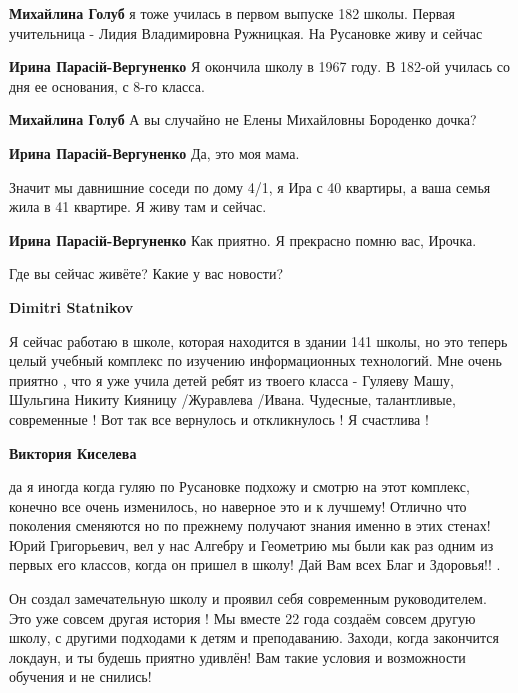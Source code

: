 \begin{itemize}
\begin{itemize}
\textbf{Михайлина Голуб} я тоже училась в первом выпуске 182 школы. Первая учительница - Лидия Владимировна Ружницкая. На Русановке живу и сейчас

\textbf{Ирина Парасій-Вергуненко} Я окончила школу в 1967 году. В 182-ой училась со дня ее основания, с 8-го класса.

\textbf{Михайлина Голуб} А вы случайно не Елены Михайловны Бороденко дочка?

\begin{itemize} %
\textbf{Ирина Парасій-Вергуненко} Да, это моя мама.

Значит мы давнишние соседи по дому 4/1, я Ира с 40 квартиры, а ваша семья жила в 41 квартире. Я живу там и сейчас.

\textbf{Ирина Парасій-Вергуненко} Как приятно. Я прекрасно помню вас, Ирочка.

Где вы сейчас живёте? Какие у вас новости?
\end{itemize} %

\textbf{Dimitri Statnikov} 

Я сейчас работаю в школе, которая находится в здании 141 школы, но это теперь
целый учебный комплекс по изучению информационных технологий. Мне очень приятно
, что я уже учила детей ребят из твоего класса - Гуляеву Машу, Шульгина Никиту
Кияницу /Журавлева /Ивана. Чудесные, талантливые, современные ! Вот так все
вернулось и откликнулось ! Я счастлива !


\textbf{Виктория Киселева} 

да я иногда когда гуляю по Русановке подхожу и смотрю на этот комплекс, конечно
все очень изменилось, но наверное это и к лучшему! Отлично что поколения
сменяются но по прежнему получают знания именно в этих стенах! Юрий
Григорьевич, вел у нас Алгебру и Геометрию мы были как раз одним из первых его
классов, когда он пришел в школу! Дай Вам всех Благ и Здоровья!!  .


Он создал замечательную школу и проявил себя современным руководителем. Это уже
совсем другая история ! Мы вместе 22 года создаём совсем другую школу, с
другими подходами к детям и преподаванию. Заходи, когда закончится локдаун, и
ты будешь приятно удивлён! Вам такие условия и возможности обучения и не
снились!


\end{itemize}
\end{itemize}
